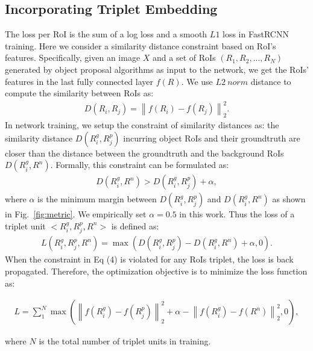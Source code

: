 \documentclass{article}
\begin{document}
{\subsection{Incorporating Triplet Embedding}
The loss per RoI is the sum of a log loss and a smooth $L1$ loss in FastRCNN training. Here we consider a similarity distance constraint based on RoI's features. Specifically, given an image $X$ and a set of RoIs $(R_1,R_2,...,R_N)$ generated by object proposal algorithms as input to the network, we get the RoIs' features in the last fully connected layer $f(R)$. We use $L2~ norm$ distance to compute the similarity between RoIs as:
\begin{equation}
\begin{array}{cl}
D(R_i, R_j) = {\left\| f(R_i)-f(R_j) \right \|}^2_2.
\end{array}
\label{eq3}
\end{equation}
In network training, we setup the constraint of similarity distances as: the similarity distance $D(R_i^g,R_j^p)$ incurring object RoIs and their groundtruth are closer than the distance between the groundtruth and the background RoIs $D(R_i^g,R^n)$. Formally, this constraint can be formulated as:
\begin{equation}
\begin{array}{cl}
D(R^g_i, R^n) >  D(R^g_i, R^p_j)+\alpha,
\end{array}
\label{eq4}
\end{equation}
where $\alpha$ is the minimum margin between $D(R_i^g,R_j^p)$ and $D(R_i^g,R^n)$ as shown in Fig.~\ref{fig:metric}. We empirically set $\alpha=0.5$ in this work. Thus the loss of a triplet unit $<R_i^g, R_j^p,R^n>$ is defined as:
 \begin{equation}
\begin{array}{cl}
L(R_i^g, R_j^p,R^n) = \max(D(R_i^g,R_j^p) - D(R_i^g,R^n) + \alpha, 0).
\end{array}
\label{eq5}
\end{equation}
When the constraint in Eq (4) is violated for any RoIs triplet, the loss is back propagated. Therefore, the optimization objective is to minimize the loss function as:\
\begin{small}
 \begin{equation}
\begin{array}{cl}
L \!= \!\sum_{1}^{N}\max({\left \|f(R_i^g)\!-\!f(R_j^p)\right \|}^2_2 \!+\!\alpha\! -\! {\left \|f(R_i^g)\!-\!f(R^n)\right \|}^2_2, \!0),
\end{array}
\label{eq6}
\end{equation}
\end{small}
where $N$ is the total number of triplet units in training.

}
\end{document}

